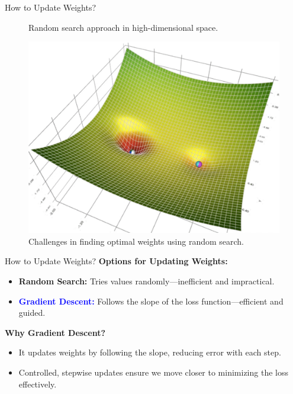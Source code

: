 \documentclass[serif, aspectratio=169]{beamer}
\begin{document}
\begin{frame}{How to Update Weights?}
\begin{figure}[!htb]
\begin{minipage}{0.3\textwidth}
            {\scriptsize Random search approach in high-dimensional space.}
  \end{minipage}\hfill
  \begin{minipage}{0.3\textwidth}
     \centering
     \includegraphics[width=.8\linewidth]{pic/gd3.png}\\
            {\scriptsize Challenges in finding optimal weights using random search.}
  \end{minipage}
\end{figure}
\end{frame}

\begin{frame}{How to Update Weights?}
 \textbf{Options for Updating Weights:}
    \begin{itemize}
        \item \textbf{Random Search:} Tries values randomly—inefficient and impractical.
        \item \textbf{\textcolor{blue}{Gradient Descent:}} Follows the slope of the loss function—efficient and guided.
    \end{itemize}
    
    \textbf{Why Gradient Descent?}
    \begin{itemize}
        \item It updates weights by following the slope, reducing error with each step.
        \item Controlled, stepwise updates ensure we move closer to minimizing the loss effectively.
    \end{itemize}
\end{frame}
\end{document}
